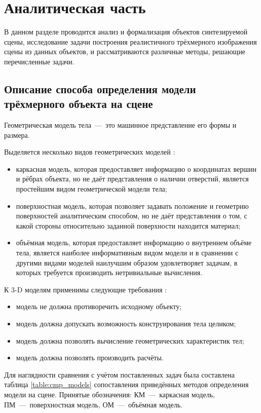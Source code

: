 \chapter{Аналитическая часть}
В данном разделе проводится анализ и формализация объектов синтезируемой сцены, исследование задачи построения реалистичного трёхмерного изображения сцены из данных объектов, и рассматриваются различные методы, решающие перечисленные задачи.

\section{Описание способа определения модели трёхмерного объекта на сцене}
Геометрическая модель тела~---~это машинное представление его формы и размера.
 
Выделяется несколько видов геометрических моделей \cite{item13}:
\begin{itemize}
	\item каркасная модель, которая предоставляет информацию о координатах вершин и рёбрах объекта, но не даёт представления о наличии отверстий, является простейшим видом геометрической модели тела;
	\item поверхностная модель, которая позволяет задавать положение и геометрию поверхностей аналитическим способом, но не даёт представления о том, с какой стороны относительно заданной поверхности находится материал;
	\item объёмная модель, которая предоставляет информацию о внутреннем объёме тела, является наиболее информативным видом модели и в сравнении с другими видами моделей наилучшим образом удовлетворяет задачам, в которых требуется производить нетривиальные вычисления.
\end{itemize}

К 3-D моделям применимы следующие требования \cite{item13}:
\begin{itemize}
	\item модель не должна противоречить исходному объекту;
	\item модель должна допускать возможность конструирования тела целиком;
	\item модель должна позволять вычисление геометрических характеристик тел;
	\item модель должна позволять производить расчёты.
\end{itemize}

Для наглядности сравнения с учётом поставленных задач была составлена таблица \ref{table:cmp_models} сопоставления приведённых методов определения модели на сцене. Принятые обозначения: КМ~---~каркасная модель, ПМ~---~поверхностная модель, ОМ~---~объёмная модель.

